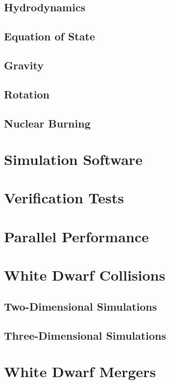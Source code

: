 \documentclass[12pt]{article}
\begin{document}
\subsection{Hydrodynamics}
\label{sec:hydrodynamics}

\subsection{Equation of State}
\label{sec:eos}

\subsection{Gravity}
\label{sec:gravity}

\subsection{Rotation}
\label{sec:rotation}

\subsection{Nuclear Burning}
\label{sec:burning}



\newpage
\section{Simulation Software}
\label{sec:software}



\newpage
\section{Verification Tests}
\label{sec:verification}



\newpage
\section{Parallel Performance}
\label{sec:performance}



\newpage
\section{White Dwarf Collisions}
\label{sec:collisions}

\subsection{Two-Dimensional Simulations}
\label{sec:collisions_2D}

\subsection{Three-Dimensional Simulations}
\label{sec:collisions_3D}



\newpage
\section{White Dwarf Mergers}
\label{sec:mergers}


\newpage


\end{document}
